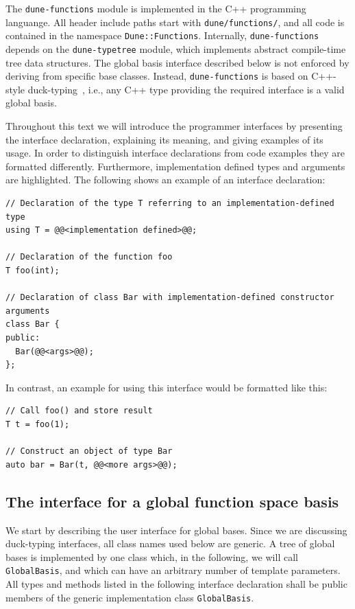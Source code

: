 \documentclass[a4paper,10pt,headings=normal,bibliography=totoc]{scrartcl}
\newcommand{\cpp}[1]{\lstinline[basicstyle=\ttfamily]!#1!}
\newcommand{\dunemodule}[1]{\texttt{#1}}
\begin{document}
The \dunemodule{dune-functions} module is implemented in the C++ programming languange.
All header include paths
start with \cpp{dune/functions/}, and all code is contained in the namespace \cpp{Dune::Functions}.
Internally, \dunemodule{dune-functions} depends on the \dunemodule{dune-typetree} module,
which implements abstract compile-time tree data structures.
The global basis interface described below is not enforced by deriving
from specific base classes. Instead, \dunemodule{dune-functions} is based on
C++-style duck-typing~\cite{koenig_moo:2005},
i.e., any C++ type providing the required
interface is a valid global basis.

Throughout this text we will introduce the programmer interfaces
by presenting the interface declaration, explaining
its meaning, and giving examples of its usage.
In order to distinguish interface declarations
from code examples they are formatted differently.
Furthermore, implementation defined types and arguments are highlighted.
The following shows an example of an interface declaration:
\begin{lstlisting}[style=Interface]
// Declaration of the type T referring to an implementation-defined type
using T = @@<implementation defined>@@;

// Declaration of the function foo
T foo(int);

// Declaration of class Bar with implementation-defined constructor arguments
class Bar {
public:
  Bar(@@<args>@@);
};
\end{lstlisting}
In contrast,
an example for using this interface would be formatted like this:
\begin{lstlisting}[style=Example]
// Call foo() and store result
T t = foo(1);

// Construct an object of type Bar
auto bar = Bar(t, @@<more args>@@);
\end{lstlisting}


\subsection{The interface for a global function space basis}
We start by describing the user interface for global bases.  Since we are discussing duck-typing interfaces,
all class names used below are generic. A tree of global bases is implemented by one class which,
in the following, we will call \cpp{GlobalBasis}, and which
can have an arbitrary number of template parameters.
All types and methods listed in the following
interface declaration shall be public members of
the generic implementation class \cpp{GlobalBasis}.
\end{document}
